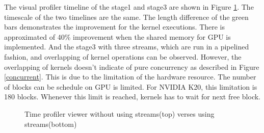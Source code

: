 \documentclass[journal,11pt,onecolumn,draftclsnofoot]{ieeeconf}  %
\begin{document}
The visual profiler timeline of the stage1 and stage3 are shown in Figure \ref{viewer}. The timescale of the two timelines are the same. The length difference of the green bars demonstrates the improvement for the kernel executions. There is approximated of 40\% improvement when the shared memory for GPU is implemented. And the stage3 with three streams, which are run in a pipelined fashion, and overlapping of kernel operations can be observed. However, the overlapping of kernels doesn't indicate of pure concurrency as described in Figure \ref{concurrent}. This is due to the limitation of the hardware resource. The number of blocks can be schedule on GPU is limited. For NVIDIA K20, this limitation is 180 blocks. Whenever this limit is reached, kernels has to wait for next free block.

\begin{figure}[!tbp]
	\centering
	\vspace*{-5mm}
	\begin{minipage}[b]{1\textwidth}
	\end{minipage}
	\begin{minipage}[b]{1\textwidth}
	\end{minipage}
	
	\caption{Time profiler viewer without using streams(top) verses using streams(bottom)}
	\label{viewer}
	\vspace*{-5mm}
\end{figure}
\end{document}
